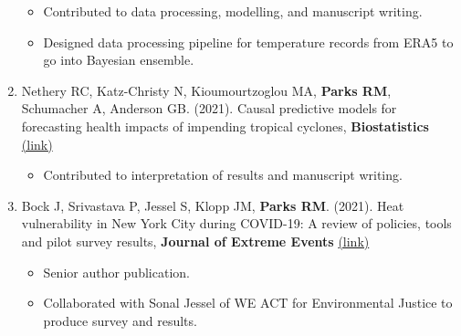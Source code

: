 \begin{enumerate}
    \begin{itemize}
        \item Contributed to data processing, modelling, and manuscript writing.
        \item Designed data processing pipeline for temperature records from ERA5 to go into Bayesian ensemble.
    \end{itemize}



     \item Nethery RC, Katz-Christy N, Kioumourtzoglou MA, \textbf{Parks RM}, Schumacher A, Anderson GB. (2021). Causal predictive models for forecasting health impacts of impending tropical cyclones, \textbf{Biostatistics} \href{https://academic.oup.com/biostatistics/advance-article/doi/10.1093/biostatistics/kxab047/6485226?guestAccessKey=378fb8f6-102d-4b21-a93d-b0a01353c19f#}{(link)}

    \begin{itemize}
        \item Contributed to interpretation of results and manuscript writing.
    \end{itemize}

    \item Bock J, Srivastava P, Jessel S, Klopp JM, \textbf{Parks RM}. (2021). Heat vulnerability in New York City during COVID-19: A review of policies, tools and pilot survey results, \textbf{Journal of Extreme Events} \href{https://www.worldscientific.com/doi/10.1142/S2345737621500159}{(link)}

    \begin{itemize}
        \item Senior author publication.
        \item Collaborated with Sonal Jessel of WE ACT for Environmental Justice to produce survey and results.
    \end{itemize}


\end{enumerate}
